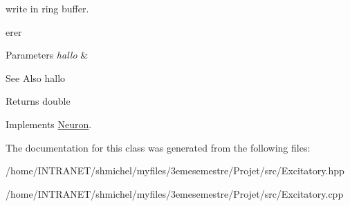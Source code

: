 write in ring buffer. 

erer 
\begin{DoxyParams}{Parameters}
{\em hallo} & \\
\hline
\end{DoxyParams}
\begin{DoxySeeAlso}{See Also}
hallo 
\end{DoxySeeAlso}
\begin{DoxyReturn}{Returns}
double 
\end{DoxyReturn}


Implements \hyperlink{classNeuron_a41c979859ae91f8f80d58b2d01e1421e}{Neuron}.



The documentation for this class was generated from the following files\-:\begin{DoxyCompactItemize}
\item 
/home/\-I\-N\-T\-R\-A\-N\-E\-T/shmichel/myfiles/3emesemestre/\-Projet/src/Excitatory.\-hpp\item 
/home/\-I\-N\-T\-R\-A\-N\-E\-T/shmichel/myfiles/3emesemestre/\-Projet/src/Excitatory.\-cpp\end{DoxyCompactItemize}
